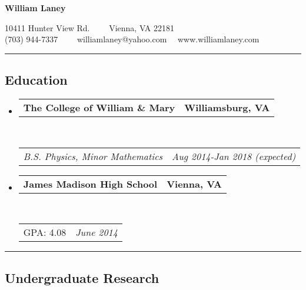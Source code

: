 \documentclass[10pt,letterpaper]{article}
\makeatletter
\newcommand{\headerrow}[2]
{\begin{tabular*}{\linewidth}{l@{\extracolsep{\fill}}r}
	#1 &
	#2 \\
\end{tabular*}}
\makeatother
\begin{document}
\begin{center}
{\LARGE \textbf{William Laney}}

10411 Hunter View Rd.\ \ \textbullet
\ \ Vienna, VA 22181
\\
(703) 944-7337\ \ \textbullet
\ \ williamlaney@yahoo.com\ \ \textbullet
www.williamlaney.com
\end{center}

\hrule
\vspace{-0.4em}
\subsection*{Education}

\begin{itemize}
	\parskip=0.1em

	\item
	\headerrow
		{\textbf{The College of William \& Mary}}
		{\textbf{Williamsburg, VA}}
	\\
	\headerrow
		{\emph{B.S. Physics, Minor Mathematics}}
		{\emph{Aug 2014-Jan 2018 (expected)}}

\item
	\headerrow
		{\textbf{James Madison High School}}
		{\textbf{Vienna, VA}}
	\\
	\headerrow
		{{GPA: 4.08}}
		{\emph{June 2014}}
	
\end{itemize}

\hrule
\vspace{-0.4em}
\subsection*{Undergraduate Research}
\end{document}

